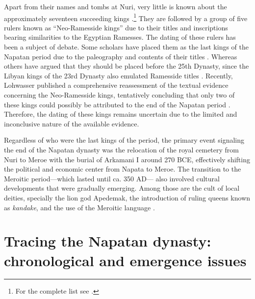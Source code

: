 Apart from their names and tombs at Nuri, very little is known about the approximately seventeen succeeding kings \parencites[p.~435]{williamsNapatanNeoKushiteState2020}[p.~139]{emberlingKushDynastyNapata2023}.\footnote{For the complete list see \cite[p.~496-497]{hornungKushiteRulersPre25th2006}.} They are followed by a group of five rulers known as “Neo-Ramesside kings” due to their titles and inscriptions bearing similarities to the Egyptian Ramesses. The dating of these rulers has been a subject of debate. Some scholars have placed them as the last kings of the Napatan period due to the paleography and contents of their titles \parencite[p.~293]{törökTwoWorldsFrontier2009}. Whereas others have argued that they should be placed before the 25th Dynasty, since the Libyan kings of the 23rd Dynasty also emulated Ramesside titles \parencites[p.~216-217]{morkotEmptyYearsNubian1991}[p.~145-150]{morkotBlackPharaohsEgypts2000}[p.~63-64]{kendallOriginNapatanState1999}. Recently, Lohwasser published a comprehensive reassessment of the textual evidence concerning the Neo-Ramesside kings, tentatively concluding that only two of these kings could possibly be attributed to the end of the Napatan period \parencite[p.~132-134]{lohwasserKushiteKingsTwentyfifth2022}. Therefore, the dating of these kings remains uncertain due to the limited and inconclusive nature of the available evidence.


Regardless of who were the last kings of the period, the primary event signaling the end of the Napatan dynasty was the relocation of the royal cemetery from Nuri to Meroe with the burial of Arkamani I around 270 BCE, effectively shifting the political and economic center from Napata to Meroe. The transition to the Meroitic period---which lasted until ca. 350 AD--- also involved cultural developments that were gradually emerging. Among those are the cult of local deities, specially the lion god Apedemak, the introduction of ruling queens known as \textit{kandake}, and the use of the Meroitic language \parencites[p.~144]{elhassanRoleEarlyNapatan2023}[p.~2]{kuckertzMeroeEgypt2021}.


\section{Tracing the Napatan dynasty: chronological and emergence issues}


